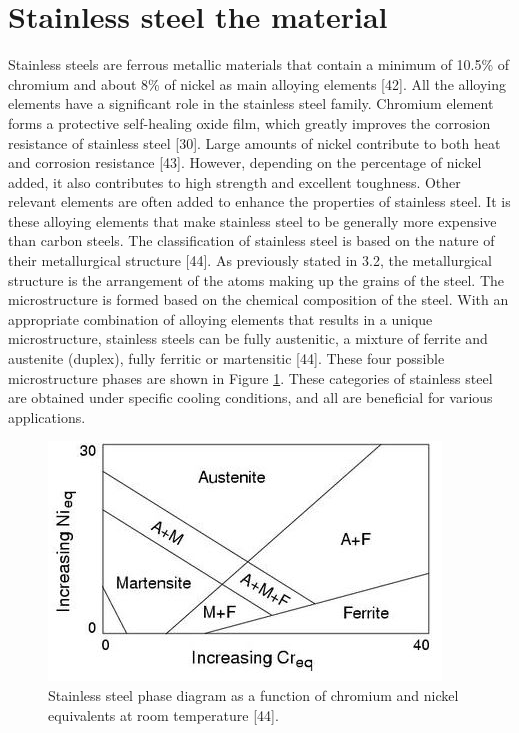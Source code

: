 \documentclass[12pt]{report}
\begin{document}
\section{Stainless steel the material} 
Stainless steels are ferrous metallic materials that contain a minimum of 10.5\% of chromium and about 8\% of nickel as main alloying elements [42]. All the alloying elements have a significant role in the stainless steel family. Chromium element forms a protective self-healing oxide film, which greatly improves the corrosion resistance of stainless steel [30]. Large amounts of nickel contribute to both heat and corrosion resistance [43]. However, depending on the percentage of nickel added, it also contributes to high strength and excellent toughness. Other relevant elements are often added to enhance the properties of stainless steel. It is these alloying elements that make stainless steel to be generally more expensive than carbon steels.
The classification of stainless steel is based on the nature of their metallurgical structure [44]. As previously stated in 3.2, the metallurgical structure is the arrangement of the atoms making up the grains of the steel. The microstructure is formed based on the chemical composition of the steel. With an appropriate combination of alloying elements that results in a unique microstructure, stainless steels can be fully austenitic, a mixture of ferrite and austenite (duplex), fully ferritic or martensitic [44]. These four possible microstructure phases are shown in Figure \ref{ch3:figure:steel_phase}. These categories of stainless steel are obtained under specific cooling conditions, and all are beneficial for various applications.
 
\begin{figure}[H]
    \centering
    \includegraphics[width=.65\textwidth]{stainless_steel_phase.jpg}
    \caption{Stainless steel phase diagram as a function of chromium and nickel equivalents at room temperature [44].}
    \label{ch3:figure:steel_phase}
\end{figure}
\end{document}
